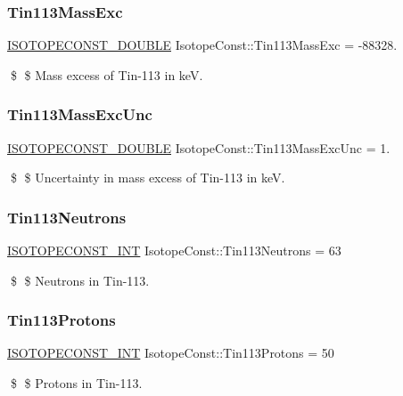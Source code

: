 \subsubsection{\texorpdfstring{Tin113\+Mass\+Exc}{Tin113MassExc}}
{\footnotesize\ttfamily \mbox{\hyperlink{group___isotope_const-_macros_ga8f45a7272ce02c0b4c65c44636ed719a}{I\+S\+O\+T\+O\+P\+E\+C\+O\+N\+S\+T\+\_\+\+D\+O\+U\+B\+LE}} Isotope\+Const\+::\+Tin113\+Mass\+Exc = -\/88328.}

\$ \$ Mass excess of Tin-\/113 in keV. \mbox{\label{group___isotope_const-_tin-_sn113_ga270a04e0bb8c1e44e18b6e498f3bb14e}} 
\subsubsection{\texorpdfstring{Tin113\+Mass\+Exc\+Unc}{Tin113MassExcUnc}}
{\footnotesize\ttfamily \mbox{\hyperlink{group___isotope_const-_macros_ga8f45a7272ce02c0b4c65c44636ed719a}{I\+S\+O\+T\+O\+P\+E\+C\+O\+N\+S\+T\+\_\+\+D\+O\+U\+B\+LE}} Isotope\+Const\+::\+Tin113\+Mass\+Exc\+Unc = 1.}

\$ \$ Uncertainty in mass excess of Tin-\/113 in keV. \mbox{\label{group___isotope_const-_tin-_sn113_ga5a098874289d166ca5135c932a255433}} 
\subsubsection{\texorpdfstring{Tin113\+Neutrons}{Tin113Neutrons}}
{\footnotesize\ttfamily \mbox{\hyperlink{group___isotope_const-_macros_ga5f18360b3e99483a35c32d789e62621c}{I\+S\+O\+T\+O\+P\+E\+C\+O\+N\+S\+T\+\_\+\+I\+NT}} Isotope\+Const\+::\+Tin113\+Neutrons = 63}

\$ \$ Neutrons in Tin-\/113. \mbox{\label{group___isotope_const-_tin-_sn113_gac343d76f289bd487f7be54d6e1dfdfb3}} 
\subsubsection{\texorpdfstring{Tin113\+Protons}{Tin113Protons}}
{\footnotesize\ttfamily \mbox{\hyperlink{group___isotope_const-_macros_ga5f18360b3e99483a35c32d789e62621c}{I\+S\+O\+T\+O\+P\+E\+C\+O\+N\+S\+T\+\_\+\+I\+NT}} Isotope\+Const\+::\+Tin113\+Protons = 50}

\$ \$ Protons in Tin-\/113. 